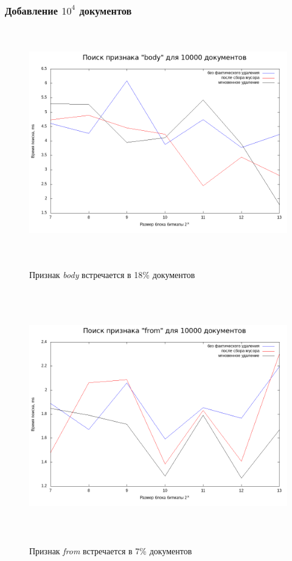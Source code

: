 \subsubsection{Добавление $10^4$ документов}

\begin{figure}[H]
\includegraphics[width=\linewidth, height=10cm]{fig/limit_1e6/1e4/body_time.png}
\caption{Признак \textit{body} встречается в 18\% документов}
\includegraphics[width=\linewidth, height=11cm]{fig/limit_1e6/1e4/from_time.png}
\caption{Признак \textit{from} встречается в 7\% документов}
\end{figure}

